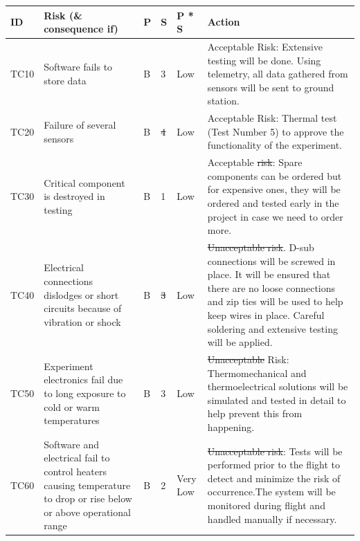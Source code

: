 \documentclass[a4paper,12pt,twoside]{article}
\providecommand{\DIFaddtex}[1]{{\protect\color{blue}\uwave{#1}}} %
\providecommand{\DIFdeltex}[1]{{\protect\color{red}\sout{#1}}}                      %
\providecommand{\DIFaddbegin}{} %
\providecommand{\DIFaddend}{} %
\providecommand{\DIFdelbegin}{} %
\providecommand{\DIFdelend}{} %
\providecommand{\DIFadd}[1]{\texorpdfstring{\DIFaddtex{#1}}{#1}} %
\providecommand{\DIFdel}[1]{\texorpdfstring{\DIFdeltex{#1}}{}} %
\newcommand{\DIFscaledelfig}{0.5}
\newlength{\DIFdelgraphicswidth} %
\newlength{\DIFdelgraphicsheight} %
\newcommand{\DIFaddincludegraphics}[2][]{{\color{blue}\fbox{\DIFOincludegraphics[#1]{#2}}}} %
\newcommand{\DIFdelincludegraphics}[2][]{%
\sbox{\DIFdelgraphicsbox}{\DIFOincludegraphics[#1]{#2}}%
\settoboxwidth{\DIFdelgraphicswidth}{\DIFdelgraphicsbox} %
\settoboxtotalheight{\DIFdelgraphicsheight}{\DIFdelgraphicsbox} %
\scalebox{\DIFscaledelfig}{%
\parbox[b]{\DIFdelgraphicswidth}{\usebox{\DIFdelgraphicsbox}\\[-\baselineskip] \rule{\DIFdelgraphicswidth}{0em}}\llap{\resizebox{\DIFdelgraphicswidth}{\DIFdelgraphicsheight}{%
\setlength{\unitlength}{\DIFdelgraphicswidth}%
\begin{picture}(1,1)%
\thicklines\linethickness{2pt} %
{\color[rgb]{1,0,0}\put(0,0){\framebox(1,1){}}}%
{\color[rgb]{1,0,0}\put(0,0){\line( 1,1){1}}}%
{\color[rgb]{1,0,0}\put(0,1){\line(1,-1){1}}}%
\end{picture}%
}\hspace*{3pt}}} %
} %
\DeclareRobustCommand{\DIFaddbegin}{\DIFOaddbegin \let\includegraphics\DIFaddincludegraphics} %
\DeclareRobustCommand{\DIFaddend}{\DIFOaddend \let\includegraphics\DIFOincludegraphics} %
\DeclareRobustCommand{\DIFdelbegin}{\DIFOdelbegin \let\includegraphics\DIFdelincludegraphics} %
\DeclareRobustCommand{\DIFdelend}{\DIFOaddend \let\includegraphics\DIFOincludegraphics} %
\begin{document}
\begin{landscape}



\begin{longtable}{|m{}| m{} |m{} |m{}|m{}| m{}|}

\hline
\textbf{ID} & \textbf{Risk (\& consequence if)} & \textbf{P} & \textbf{S} & \textbf{P * S} & \textbf{Action} \\ \hline
TC10 & Software fails to store data & B & 3 & \cellcolor[HTML]{FCFF2F}Low & Acceptable Risk: Extensive testing will be done. Using telemetry, all data gathered from sensors will be sent to ground station. \\ \hline
TC20 & Failure of several sensors & B & \DIFdelbegin \DIFdel{4 }\DIFdelend \DIFaddbegin \DIFadd{3 }\DIFaddend & \cellcolor[HTML]{FCFF2F}Low & Acceptable Risk: Thermal test (Test Number 5) to approve the functionality of the experiment. \\ \hline
TC30 & Critical component is destroyed in testing & B & 1 & \DIFdelbegin %
\DIFdelend \DIFaddbegin \cellcolor[HTML]{34FF34}\DIFadd{Very }\DIFaddend Low & Acceptable \DIFdelbegin \DIFdel{risk}\DIFdelend \DIFaddbegin \DIFadd{Risk}\DIFaddend : Spare components can be ordered but for expensive ones, they will be ordered and tested early in the project in case we need to order more. \\ \hline
TC40 & Electrical connections dislodges or short circuits because of vibration or shock & B & \DIFdelbegin \DIFdel{3 }\DIFdelend \DIFaddbegin \DIFadd{4 }\DIFaddend & \cellcolor[HTML]{FCFF2F}Low & \DIFdelbegin \DIFdel{Unacceptable risk}\DIFdelend \DIFaddbegin \DIFadd{Acceptable Risk}\DIFaddend . D-sub connections will be screwed in place. It will be ensured that there are no loose connections and zip ties will be used to help keep wires in place. Careful soldering and extensive testing will be applied. \\ \hline
TC50 & Experiment electronics fail due to long exposure to cold or warm temperatures & B & 3 & \cellcolor[HTML]{FCFF2F}Low & \DIFdelbegin \DIFdel{Unacceptable }\DIFdelend \DIFaddbegin \DIFadd{Acceptable }\DIFaddend Risk: Thermomechanical and thermoelectrical solutions will be simulated and tested in detail to help prevent this from happening. \\ \hline
TC60 & Software and electrical fail to control heaters causing temperature to drop or rise below or above operational range & B & 2 & \cellcolor[HTML]{34FF34}Very Low & \DIFdelbegin \DIFdel{Unacceptable risk}\DIFdelend \DIFaddbegin \DIFadd{Acceptable Risk}\DIFaddend : Tests will be performed prior to the flight to detect and minimize the risk of occurrence.The system will be monitored during flight and handled manually if necessary. \\ \hline

\end{longtable}
\end{landscape}
\end{document}
